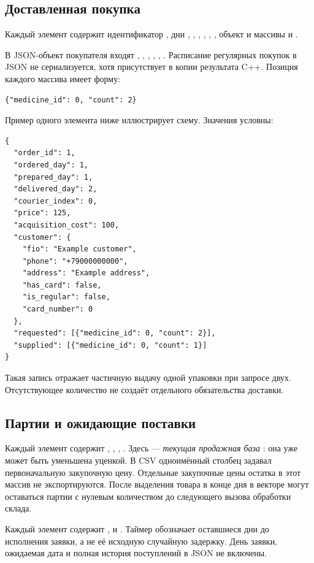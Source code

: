 \subsection{Доставленная покупка}
Каждый элемент  содержит идентификатор
, дни , ,
, , ,
, объект  и массивы
 и .

В JSON-объект покупателя входят , , ,
, , .
Расписание регулярных покупок в JSON не сериализуется, хотя присутствует
в копии  результата C++.
Позиция каждого массива имеет форму:
\begin{lstlisting}
{"medicine_id": 0, "count": 2}
\end{lstlisting}

Пример одного элемента ниже иллюстрирует схему. Значения условны:
\begin{lstlisting}
{
  "order_id": 1,
  "ordered_day": 1,
  "prepared_day": 1,
  "delivered_day": 2,
  "courier_index": 0,
  "price": 125,
  "acquisition_cost": 100,
  "customer": {
    "fio": "Example customer",
    "phone": "+79000000000",
    "address": "Example address",
    "has_card": false,
    "is_regular": false,
    "card_number": 0
  },
  "requested": [{"medicine_id": 0, "count": 2}],
  "supplied": [{"medicine_id": 0, "count": 1}]
}
\end{lstlisting}
Такая запись отражает частичную выдачу одной упаковки при запросе двух.
Отсутствующее количество не создаёт отдельного обязательства доставки.

\subsection{Партии и ожидающие поставки}
Каждый элемент  содержит , ,
, . Здесь  ---
\emph{текущая продажная база} : она уже может быть уменьшена
уценкой. В CSV одноимённый столбец задавал первоначальную закупочную цену.
Отдельные закупочные цены остатка в этот массив не экспортируются.
После выделения товара в конце дня в векторе могут оставаться партии
с нулевым количеством до следующего вызова обработки склада.

Каждый элемент  содержит ,
 и . Таймер обозначает оставшиеся дни
до исполнения заявки, а не её исходную случайную задержку.
День заявки, ожидаемая дата и полная история поступлений в JSON не включены.

